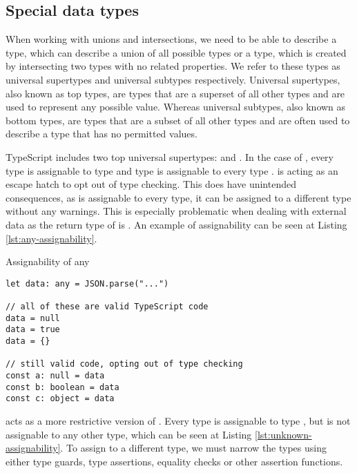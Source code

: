 \subsection{Special data types}

When working with unions and intersections, we need to be able to describe a type, which can describe a union of all possible types or a type, which is created by intersecting two types with no related properties. We refer to these types as universal supertypes and universal subtypes respectively. Universal supertypes, also known as top types, are types that are a superset of all other types and are used to represent any possible value. Whereas universal subtypes, also known as bottom types, are types that are a subset of all other types and are often used to describe a type that has no permitted values.

TypeScript includes two top universal supertypes:  and . In the case of , every type is assignable to type  and type  is assignable to every type \cite{TopTypesAny}.  is acting as an escape hatch to opt out of type checking. This does have unintended consequences, as  is assignable to every type, it can be assigned to a different type without any warnings. This is especially problematic when dealing with external data as the return type of  is . An example of assignability can be seen at Listing \ref{lst:any-assignability}.

\begin{listing}[h]
  \caption{Assignability of any}\label{lst:any-assignability}
  \begin{verbatim}
let data: any = JSON.parse("...") 

// all of these are valid TypeScript code
data = null
data = true
data = {}

// still valid code, opting out of type checking
const a: null = data
const b: boolean = data
const c: object = data
  \end{verbatim}
\end{listing}

 acts as a more restrictive version of . Every type is assignable to type , but  is not assignable to any other type, which can be seen at Listing \ref{lst:unknown-assignability}. To assign  to a different type, we must narrow the types using either type guards, type assertions, equality checks or other assertion functions.

